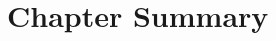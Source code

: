 \documentclass[../main.tex]{subfiles}
\begin{document}
\section{Chapter Summary}

%
%
%
%
%
%
%
\end{document}
